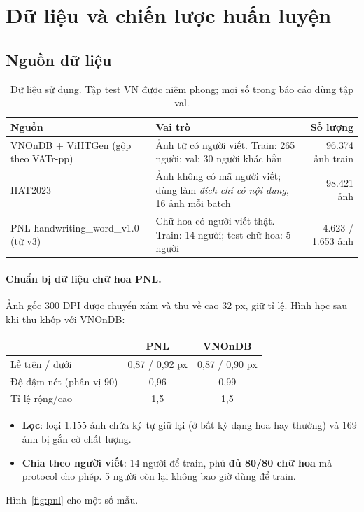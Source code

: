 \documentclass[11pt,a4paper]{article}
\begin{document}
\section{Dữ liệu và chiến lược huấn luyện}
\label{sec:data}

\subsection{Nguồn dữ liệu}
\begin{table}[h]
\centering\small
\caption{Dữ liệu sử dụng. Tập test VN được niêm phong; mọi số trong báo cáo dùng tập val.}
\label{tab:data}
\begin{tabularx}{\linewidth}{lXr}
\toprule
Nguồn & Vai trò & Số lượng \\
\midrule
VNOnDB + ViHTGen (gộp theo VATr-pp) & Ảnh từ có người viết. Train: 265 người; val: 30 người khác hẳn & 96.374 ảnh train \\
HAT2023 & Ảnh không có mã người viết; dùng làm \emph{đích chỉ có nội dung}, 16 ảnh mỗi batch & 98.421 ảnh \\
PNL handwriting\_word\_v1.0 (từ v3) & Chữ hoa có người viết thật. Train: 14 người; test chữ hoa: 5 người & 4.623 / 1.653 ảnh \\
\bottomrule
\end{tabularx}
\end{table}

\paragraph{Chuẩn bị dữ liệu chữ hoa PNL.} Ảnh gốc 300 DPI được chuyển xám và thu về cao 32 px, giữ tỉ lệ. Hình học sau khi thu khớp với VNOnDB:

\begin{center}\small
\begin{tabular}{lcc}
\toprule
& PNL & VNOnDB \\
\midrule
Lề trên / dưới & 0,87 / 0,92 px & 0,87 / 0,90 px \\
Độ đậm nét (phân vị 90) & 0,96 & 0,99 \\
Tỉ lệ rộng/cao & 1,5 & 1,5 \\
\bottomrule
\end{tabular}
\end{center}

\begin{itemize}
\item \textbf{Lọc}: loại 1.155 ảnh chứa ký tự giữ lại (ở bất kỳ dạng hoa hay thường) và 169 ảnh bị gắn cờ chất lượng.
\item \textbf{Chia theo người viết}: 14 người để train, phủ \textbf{đủ 80/80 chữ hoa} mà protocol cho phép. 5 người còn lại không bao giờ dùng để train.
\end{itemize}
Hình~\ref{fig:pnl} cho một số mẫu.
\end{document}
